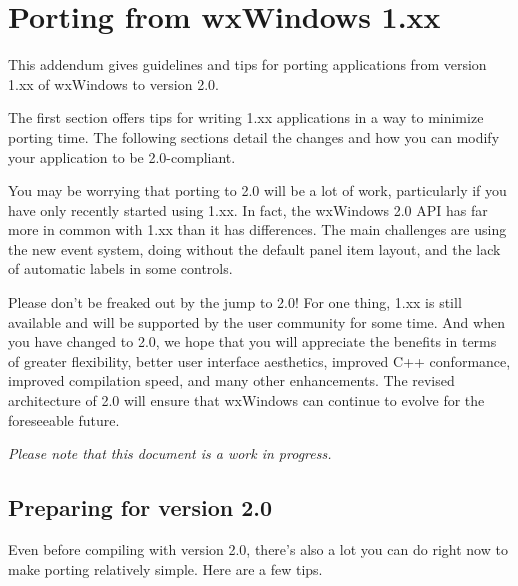 \chapter{Porting from wxWindows 1.xx}\label{porting}

This addendum gives guidelines and tips for porting applications from
version 1.xx of wxWindows to version 2.0.

The first section offers tips for writing 1.xx applications in a way to
minimize porting time. The following sections detail the changes and
how you can modify your application to be 2.0-compliant.

You may be worrying that porting to 2.0 will be a lot of work,
particularly if you have only recently started using 1.xx. In fact,
the wxWindows 2.0 API has far more in common with 1.xx than it has differences.
The main challenges are using the new event system, doing without the default
panel item layout, and the lack of automatic labels in some controls.

Please don't be freaked out by the jump to 2.0! For one thing, 1.xx is still available
and will be supported by the user community for some time. And when you have
changed to 2.0, we hope that you will appreciate the benefits in terms
of greater flexibility, better user interface aesthetics, improved C++ conformance,
improved compilation speed, and many other enhancements. The revised architecture
of 2.0 will ensure that wxWindows can continue to evolve for the foreseeable
future.

{\it Please note that this document is a work in progress.}

\section{Preparing for version 2.0}\label{portingpreparing}

Even before compiling with version 2.0, there's also a lot you can do right now to make porting
relatively simple. Here are a few tips.

